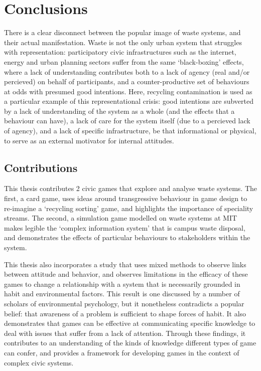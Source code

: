 \documentclass[nofonts,nols,justified,nobib]{tufte-book}
\begin{document}
\chapter*{Conclusions}

There is a clear disconnect between the popular image of waste systems, and their actual manifestation. Waste is not the only urban system that struggles with representation: participatory civic infrastructures such as the internet, energy \cite{onuoha_i_2016} and urban planning sectors suffer from the same `black-boxing' effects, where a lack of understanding contributes both to a lack of agency (real and/or percieved) on behalf of participants, and a counter-productive set of behaviours at odds with presumed good intentions. Here, recycling contamination is used as a particular example of this representational crisis: good intentions are subverted by a lack of understanding of the system as a whole (and the effects that a behaviour can have), a lack of care for the system itself (due to a percieved lack of agency), and a lack of specific infrastructure, be that informational or physical, to serve as an external motivator for internal attitudes.


\section*{Contributions}
This thesis contributes 2 civic games that explore and analyse waste systems. The first, a card game, uses ideas around transgressive behaviour in game design to re-imagine a `recycling sorting' game, and highlights the importance of speciality streams. The second, a simulation game modelled on waste systems at MIT makes legible the `complex information system' that is campus waste disposal, and demonstrates the effects of particular behaviours to stakeholders within the system.

This thesis also incorporates a study that uses mixed methods to observe links between attitude and behavior, and observes limitations in the efficacy of these games to change a relationship with a system that is necessarily grounded in habit and environmental factors. This result is one discussed by a number of scholars of environmental psychology, but it nonetheless contradicts a popular belief: that awareness of a problem is sufficient to shape forces of habit. It also demonstrates that games can be effective at communicating specific knowledge to deal with issues that suffer from a lack of attention. Through these findings, it contributes to an understanding of the kinds of knowledge different types of game can confer, and provides a framework for developing games in the context of complex civic systems.
\end{document}
